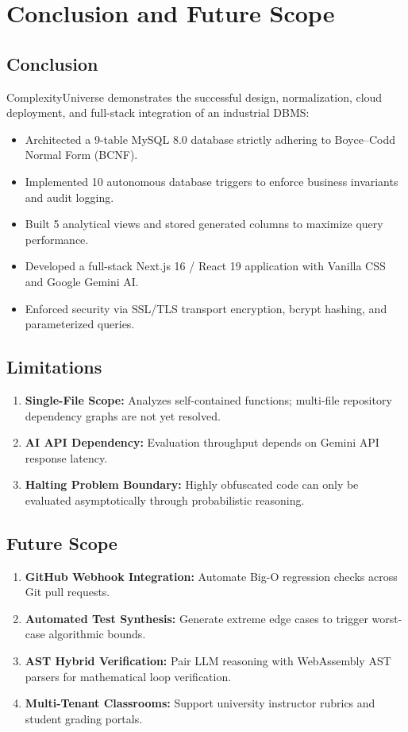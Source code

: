 \documentclass[12pt,a4paper]{report}
\DeclareRobustCommand{\_}{\textunderscore\allowbreak}
\begin{document}
\chapter{Conclusion and Future Scope}

\section{Conclusion}
ComplexityUniverse demonstrates the successful design, normalization, cloud deployment, and full-stack integration of an industrial DBMS:
\begin{itemize}
    \item Architected a 9-table MySQL 8.0 database strictly adhering to Boyce--Codd Normal Form (BCNF).
    \item Implemented 10 autonomous database triggers to enforce business invariants and audit logging.
    \item Built 5 analytical views and stored generated columns to maximize query performance.
    \item Developed a full-stack Next.js 16 / React 19 application with Vanilla CSS and Google Gemini AI.
    \item Enforced security via SSL/TLS transport encryption, bcrypt hashing, and parameterized queries.
\end{itemize}

\section{Limitations}
\begin{enumerate}
    \item \textbf{Single-File Scope:} Analyzes self-contained functions; multi-file repository dependency graphs are not yet resolved.
    \item \textbf{AI API Dependency:} Evaluation throughput depends on Gemini API response latency.
    \item \textbf{Halting Problem Boundary:} Highly obfuscated code can only be evaluated asymptotically through probabilistic reasoning.
\end{enumerate}

\section{Future Scope}
\begin{enumerate}
    \item \textbf{GitHub Webhook Integration:} Automate Big-O regression checks across Git pull requests.
    \item \textbf{Automated Test Synthesis:} Generate extreme edge cases to trigger worst-case algorithmic bounds.
    \item \textbf{AST Hybrid Verification:} Pair LLM reasoning with WebAssembly AST parsers for mathematical loop verification.
    \item \textbf{Multi-Tenant Classrooms:} Support university instructor rubrics and student grading portals.
\end{enumerate}
\end{document}
